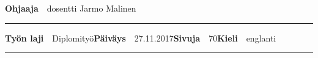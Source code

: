 \begin{spacing}{.88}
{  {\fontsize{10.5pt}{10.5pt}\bfseries\sffamily\lsstyle Ohjaaja}~~{\small dosentti Jarmo Malinen}

  \vspace{-2.4mm}\rule{\textwidth}{.75pt}

  {\fontsize{10.5pt}{10.5pt}\bfseries\sffamily\lsstyle Työn laji}~~{\small Diplomityö}\hfill{\fontsize{10.5pt}{10.5pt}\bfseries\sffamily\lsstyle Päiväys}~~{\small 27.11.2017}\hfill{\fontsize{10.5pt}{10.5pt}\bfseries\sffamily\lsstyle Sivuja}~~{\small 70}\hfill{\fontsize{10.5pt}{10.5pt}\bfseries\sffamily\lsstyle Kieli}~~{\small englanti}

  \vspace{-2.4mm}\rule{\textwidth}{.75pt}

  \vspace{6mm}

  } %
  \end{spacing}
